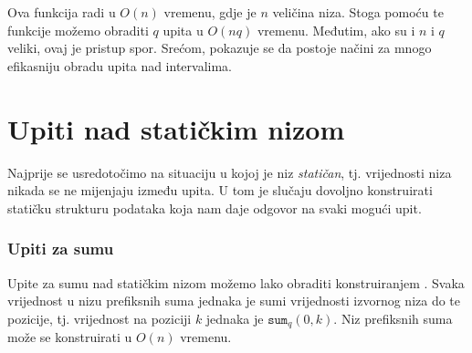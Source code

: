 Ova funkcija radi u $O(n)$ vremenu,
gdje je $n$ veličina niza.
Stoga pomoću te funkcije možemo obraditi $q$ upita u $O(nq)$
vremenu.
Međutim, ako su i $n$ i $q$ veliki, ovaj je pristup
spor. Srećom, pokazuje se da postoje
načini za mnogo efikasniju obradu upita nad intervalima.

\section{Upiti nad statičkim nizom}

Najprije se usredotočimo na situaciju u kojoj je
niz \emph{statičan}, tj.
vrijednosti niza nikada se ne mijenjaju između upita.
U tom je slučaju dovoljno konstruirati
statičku strukturu podataka koja nam daje
odgovor na svaki mogući upit.

\subsubsection{Upiti za sumu}


Upite za sumu nad statičkim nizom
možemo lako obraditi
konstruiranjem .
Svaka vrijednost u nizu prefiksnih suma jednaka je
sumi vrijednosti izvornog niza do te pozicije,
tj. vrijednost na poziciji $k$ jednaka je $\texttt{sum}_q(0,k)$.
Niz prefiksnih suma može se konstruirati u $O(n)$ vremenu.

